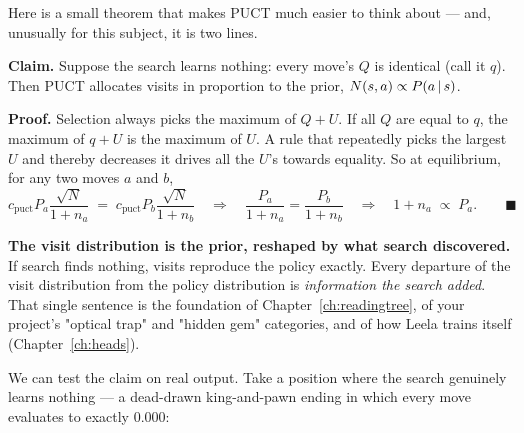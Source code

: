Here is a small theorem that makes PUCT much easier to think about --- and, unusually for
this subject, it is two lines.

\begin{established}
\textbf{Claim.} Suppose the search learns nothing: every move's $Q$ is identical (call it
$q$). Then PUCT allocates visits in proportion to the prior, $N(s,a) \propto P(a\,|\, s)$.

\smallskip
\textbf{Proof.} Selection always picks the maximum of $Q + U$. If all $Q$ are equal to $q$,
the maximum of $q + U$ is the maximum of $U$. A rule that repeatedly picks the largest $U$
and thereby decreases it drives all the $U$'s towards equality. So at equilibrium, for any
two moves $a$ and $b$,
\[
  c_{\text{puct}}P_a\frac{\sqrt{N}}{1+n_a} \;=\; c_{\text{puct}}P_b\frac{\sqrt{N}}{1+n_b}
  \quad\Longrightarrow\quad \frac{P_a}{1+n_a} = \frac{P_b}{1+n_b}
  \quad\Longrightarrow\quad 1+n_a \;\propto\; P_a . \qquad\blacksquare
\]
\end{established}

\begin{keyidea}
\textbf{The visit distribution is the prior, reshaped by what search discovered.} If search
finds nothing, visits reproduce the policy exactly. Every departure of the visit distribution
from the policy distribution is \emph{information the search added}. That single sentence is
the foundation of Chapter~\ref{ch:readingtree}, of your project's "optical trap" and
"hidden gem" categories, and of how Leela trains itself (Chapter~\ref{ch:heads}).
\end{keyidea}

We can test the claim on real output. Take a position where the search genuinely learns
nothing --- a dead-drawn king-and-pawn ending in which every move evaluates to exactly $0.000$:

